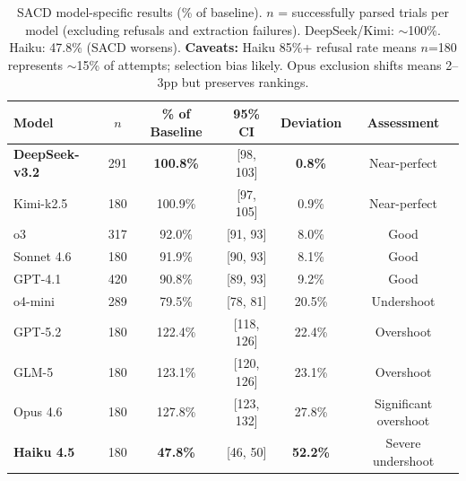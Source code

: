 \documentclass[11pt]{article}
\begin{document}
\begin{table}[H]
\centering
\begin{tabular}{lccccc}
\toprule
Model & $n$ & \% of Baseline & 95\% CI & Deviation & Assessment \\
\midrule
\textbf{DeepSeek-v3.2} & 291 & \textbf{100.8\%} & [98, 103] & \textbf{0.8\%} & Near-perfect \\
Kimi-k2.5 & 180 & 100.9\% & [97, 105] & 0.9\% & Near-perfect \\
o3 & 317 & 92.0\% & [91, 93] & 8.0\% & Good \\
Sonnet 4.6 & 180 & 91.9\% & [90, 93] & 8.1\% & Good \\
GPT-4.1 & 420 & 90.8\% & [89, 93] & 9.2\% & Good \\
o4-mini & 289 & 79.5\% & [78, 81] & 20.5\% & Undershoot \\
GPT-5.2 & 180 & 122.4\% & [118, 126] & 22.4\% & Overshoot \\
GLM-5 & 180 & 123.1\% & [120, 126] & 23.1\% & Overshoot \\
Opus 4.6 & 180 & 127.8\% & [123, 132] & 27.8\% & Significant overshoot \\
\textbf{Haiku 4.5} & 180 & \textbf{47.8\%} & [46, 50] & \textbf{52.2\%} & Severe undershoot \\
\bottomrule
\end{tabular}
\caption{SACD model-specific results (\% of baseline). $n$ = successfully parsed trials per model (excluding refusals and extraction failures). DeepSeek/Kimi: $\sim$100\%. Haiku: 47.8\% (SACD worsens). \textbf{Caveats:} Haiku 85\%+ refusal rate means $n$=180 represents $\sim$15\% of attempts; selection bias likely. Opus exclusion shifts means 2--3pp but preserves rankings.}
\label{tab:sacd-by-model}
\end{table}
\end{document}
